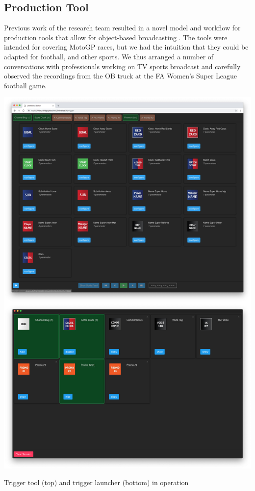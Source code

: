 \documentclass[sigchi-a, authorversion]{acmart}
\begin{document}
\subsection{Production Tool}
Previous work of the research team resulted in a novel model and workflow for
production tools that allow for object-based broadcasting \cite{Li:2018_TVX}.
The tools were intended for covering MotoGP races, but we had the intuition that
they could be adapted for football, and other sports. We thus arranged a number
of conversations with professionals working on TV sports broadcast and carefully
observed the recordings from the OB truck at the FA Women's Super League football
game.

\begin{marginfigure}
    \includegraphics[width=\marginparwidth-10pt]{Figures/triggertool.jpg}
    \caption{Trigger tool (top) and trigger launcher (bottom) in operation}
    \label{fig:triggertool}
\end{marginfigure}
\end{document}
